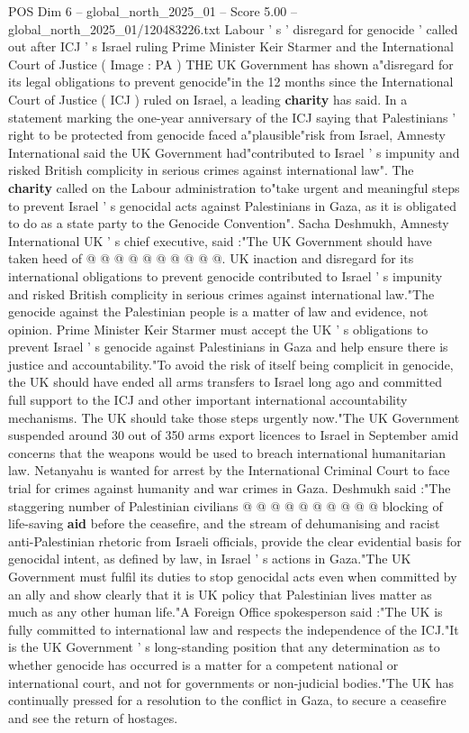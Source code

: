 \begin{textsample}{POS Dim 6 – global\_north\_2025\_01 – Score 5.00 – global\_north\_2025\_01/120483226.txt}  \label{ex:f6_pos_344}
Labour ' s ' disregard for genocide ' called out after ICJ ' s Israel ruling Prime Minister Keir Starmer and the International Court of Justice ( Image : PA ) THE UK Government has shown a"disregard for its legal obligations to prevent genocide"in the 12 months since the International Court of Justice ( ICJ ) ruled on Israel, a leading \textbf{charity} has said.
In a statement marking the one-year anniversary of the ICJ saying that Palestinians ' right to be protected from genocide faced a"plausible"risk from Israel, Amnesty International said the UK Government had"contributed to Israel ' s impunity and risked British complicity in serious crimes against international law".
The \textbf{charity} called on the Labour administration to"take urgent and meaningful steps to prevent Israel ' s genocidal acts against Palestinians in Gaza, as it is obligated to do as a state party to the Genocide Convention".
Sacha Deshmukh, Amnesty International UK ' s chief executive, said :"The UK Government should have taken heed of @ @ @ @ @ @ @ @ @ @.
UK inaction and disregard for its international obligations to prevent genocide contributed to Israel ' s impunity and risked British complicity in serious crimes against international law."The genocide against the Palestinian people is a matter of law and evidence, not opinion.
Prime Minister Keir Starmer must accept the UK ' s obligations to prevent Israel ' s genocide against Palestinians in Gaza and help ensure there is justice and accountability."To avoid the risk of itself being complicit in genocide, the UK should have ended all arms transfers to Israel long ago and committed full support to the ICJ and other important international accountability mechanisms.
The UK should take those steps urgently now."The UK Government suspended around 30 out of 350 arms export licences to Israel in September amid concerns that the weapons would be used to breach international humanitarian law.
Netanyahu is wanted for arrest by the International Criminal Court to face trial for crimes against humanity and war crimes in Gaza.
Deshmukh said :"The staggering number of Palestinian civilians @ @ @ @ @ @ @ @ @ @ blocking of life-saving \textbf{aid} before the ceasefire, and the stream of dehumanising and racist anti-Palestinian rhetoric from Israeli officials, provide the clear evidential basis for genocidal intent, as defined by law, in Israel ' s actions in Gaza."The UK Government must fulfil its duties to stop genocidal acts even when committed by an ally and show clearly that it is UK policy that Palestinian lives matter as much as any other human life."A Foreign Office spokesperson said :"The UK is fully committed to international law and respects the independence of the ICJ."It is the UK Government ' s long-standing position that any determination as to whether genocide has occurred is a matter for a competent national or international court, and not for governments or non-judicial bodies."The UK has continually pressed for a resolution to the conflict in Gaza, to secure a ceasefire and see the return of hostages.

\end{textsample}
